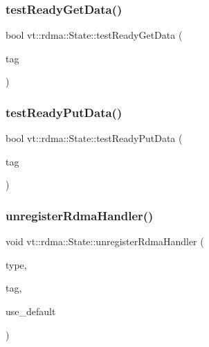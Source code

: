 \mbox{\label{structvt_1_1rdma_1_1_state_aca75303aab9cc0650fd774048e59239e}} 
\subsubsection{\texorpdfstring{test\+Ready\+Get\+Data()}{testReadyGetData()}}
{\footnotesize\ttfamily bool vt\+::rdma\+::\+State\+::test\+Ready\+Get\+Data (\begin{DoxyParamCaption}\item[{\hyperlink{namespacevt_a84ab281dae04a52a4b243d6bf62d0e52}{Tag\+Type} const \&}]{tag }\end{DoxyParamCaption})}

\mbox{\label{structvt_1_1rdma_1_1_state_a4fc0ac910f62594cc74a82646b9b1d88}} 
\subsubsection{\texorpdfstring{test\+Ready\+Put\+Data()}{testReadyPutData()}}
{\footnotesize\ttfamily bool vt\+::rdma\+::\+State\+::test\+Ready\+Put\+Data (\begin{DoxyParamCaption}\item[{\hyperlink{namespacevt_a84ab281dae04a52a4b243d6bf62d0e52}{Tag\+Type} const \&}]{tag }\end{DoxyParamCaption})}

\mbox{\label{structvt_1_1rdma_1_1_state_a3c506325f5d0ce4bb46f93f046dd5e3a}} 
\subsubsection{\texorpdfstring{unregister\+Rdma\+Handler()}{unregisterRdmaHandler()}\hspace{0.1cm}{\footnotesize\ttfamily [1/2]}}
{\footnotesize\ttfamily void vt\+::rdma\+::\+State\+::unregister\+Rdma\+Handler (\begin{DoxyParamCaption}\item[{\hyperlink{namespacevt_1_1rdma_ac848e1d9da43db6294bd06f83e5d3946}{R\+D\+M\+A\+\_\+\+Type\+Type} const \&}]{type,  }\item[{\hyperlink{namespacevt_a84ab281dae04a52a4b243d6bf62d0e52}{Tag\+Type} const \&}]{tag,  }\item[{bool const \&}]{use\+\_\+default }\end{DoxyParamCaption})}

